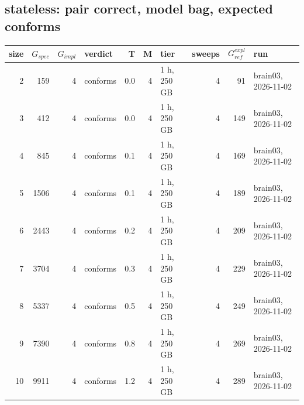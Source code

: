 \documentclass[10pt]{article}
\begin{document}
\subsection*{stateless: pair \textsf{correct}, model bag, expected conforms}
\begin{longtable}{@{}rrrlrrlrrl@{}}
\toprule
size & $G_{\mathit{spec}}$ & $G_{\mathit{impl}}$ & verdict & T & M & tier & sweeps & $G_{\mathit{ref}}^{\mathit{expl}}$ & run \\
\midrule
\endhead
\color{blue} 2 & 159 & 4 & conforms & 0.0 & 4 & 1 h, 250 GB & 4 & 91 & brain03, 2026-11-02 \\
\color{blue} 3 & 412 & 4 & conforms & 0.0 & 4 & 1 h, 250 GB & 4 & 149 & brain03, 2026-11-02 \\
\color{blue} 4 & 845 & 4 & conforms & 0.1 & 4 & 1 h, 250 GB & 4 & 169 & brain03, 2026-11-02 \\
\color{blue} 5 & 1506 & 4 & conforms & 0.1 & 4 & 1 h, 250 GB & 4 & 189 & brain03, 2026-11-02 \\
\color{blue} 6 & 2443 & 4 & conforms & 0.2 & 4 & 1 h, 250 GB & 4 & 209 & brain03, 2026-11-02 \\
\color{blue} 7 & 3704 & 4 & conforms & 0.3 & 4 & 1 h, 250 GB & 4 & 229 & brain03, 2026-11-02 \\
\color{blue} 8 & 5337 & 4 & conforms & 0.5 & 4 & 1 h, 250 GB & 4 & 249 & brain03, 2026-11-02 \\
\color{blue} 9 & 7390 & 4 & conforms & 0.8 & 4 & 1 h, 250 GB & 4 & 269 & brain03, 2026-11-02 \\
\color{blue} 10 & 9911 & 4 & conforms & 1.2 & 4 & 1 h, 250 GB & 4 & 289 & brain03, 2026-11-02 \\
\bottomrule
\end{longtable}
\end{document}
